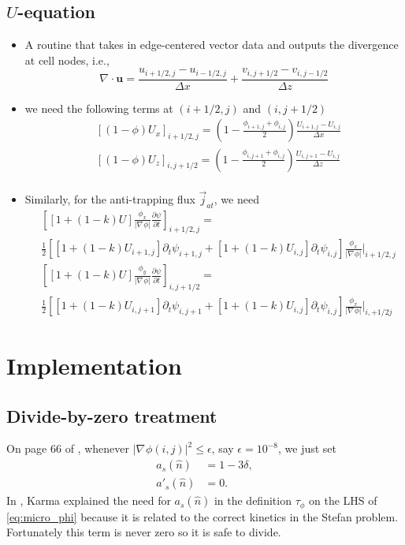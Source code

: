 \documentclass[a4paper,12pt]{article}
\newcommand{\B}[1]{\mathbf{#1}}
\renewcommand{\div}[1]{\nabla_{#1} \cdot}
\newcommand{\grad}[1]{\nabla_{#1}}
\begin{document}
\subsection{$U$-equation}
\begin{itemize}
\item A routine that takes in edge-centered vector data and outputs the divergence at cell nodes, i.e.,
\begin{equation}
\div{} \B{u} = \frac{u_{i+1/2,j} - u_{i-1/2,j}}{\Delta x} +  \frac{v_{i, j+1/2} - v_{i,j-1/2}}{\Delta z}
\end{equation}

\item we need the following terms at $(i+1/2,j)$ and $(i,j+1/2)$
\begin{align}
& [(1-\phi) U_x]_{i+1/2,j} = \left( 1- \frac{\phi_{i+1,j} + \phi_{i,j}}{2} \right) \frac{U_{i+1,j}-U_{i,j}}{\Delta x}\\
& [(1-\phi) U_z]_{i,j+1/2} = \left( 1- \frac{\phi_{i,j+1} + \phi_{i,j}}{2} \right) \frac{U_{i,j+1}-U_{i,j}}{\Delta z}\\
\end{align}

\item Similarly, for the anti-trapping flux $\vec{j}_{at}$, we need
\begin{align}
& \left[ [1+(1-k)U]  \frac{\phi_x}{ |\grad{} \phi | } \frac{\partial \psi}{\partial t}  \right]_{i+1/2,j} = \nonumber \\
&  \frac{1}{2}\left[[1+(1-k)U_{i+1,j}]\partial_t\psi_{i+1,j}+[1+(1-k)U_{i,j}]\partial_t\psi_{i,j}\right]  \frac{\phi_x}{ |\grad{} \phi | }\bigg|_{i+1/2,j}  \\
& \left[ [1+(1-k)U]  \frac{\phi_y}{ |\grad{} \phi | } \frac{\partial \psi}{\partial t}  \right]_{i,j+1/2} = \nonumber \\ 
& \frac{1}{2}\left[[1+(1-k)U_{i,j+1}]\partial_t\psi_{i,j+1}+[1+(1-k)U_{i,j}]\partial_t\psi_{i,j}\right]  \frac{\phi_x}{ |\grad{} \phi | }\bigg|_{i,+1/2j}  
\end{align}
\end{itemize}

\section{Implementation}


\subsection{Divide-by-zero treatment}
On page 66 of \cite{Provatas2010}, whenever $|\grad{}\phi(i,j)|^{2} \leq \epsilon $, say $\epsilon = 10^{-8}$, we just set
\begin{align*}
a_s(\hat{n}) &= 1-3\delta, \\
a'_s(\hat{n}) &= 0.
\end{align*}
In \cite{Karma1998}, Karma explained the need for $a_s(\hat{n})$ in the definition $\tau_{\phi}$ on the LHS of \cref{eq:micro_phi} because it is related to the correct kinetics in the Stefan problem. Fortunately this term is never zero so it is safe to divide. 
\end{document}

